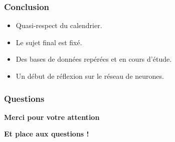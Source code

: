 \begin{frame}
	\frametitle{Conclusion}
	\begin{itemize}
		\setlength{\itemsep}{1.2\baselineskip}
		\item Quasi-respect du calendrier.
		\item Le sujet final est fixé.
		\item Des bases de données repérées et en cours d'étude.
		\item Un début de réflexion sur le réseau de neurones.
	\end{itemize}
\end{frame}

\begin{frame}
	\frametitle{Questions}
	\fontsize{20pt}{20pt}\selectfont
	\vspace*{\fill}
	\begin{center}
		\textbf{Merci pour votre attention}
	\end{center}
	\begin{center}
		\noindent\textbf{Et place aux questions !}
	\end{center}
	\vspace*{\fill}
\end{frame}